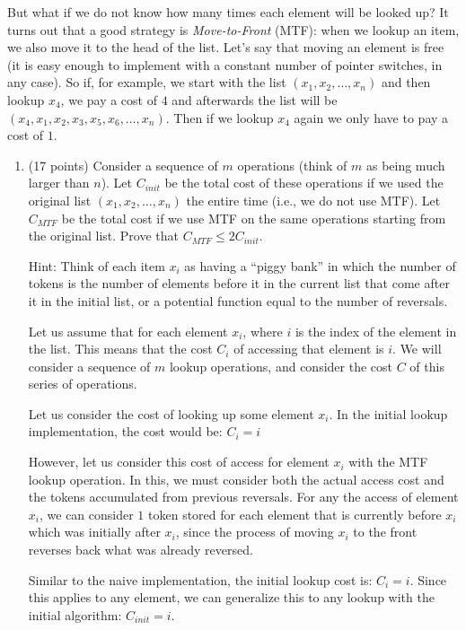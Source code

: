 \documentclass[11pt]{article}
\begin{document}
But what if we do not know how many times each element will be looked up?  It turns out that a good strategy is \emph{Move-to-Front} (MTF): 
when we lookup an item, we also move it to the head of the list.  Let's say that moving an element is free 
(it is easy enough to implement with a constant number of pointer switches, in any case). 
So if, for example, we start with the list $(x_1, x_2, \dots, x_n)$ and then lookup $x_4$, we pay a cost of $4$ and 
afterwards the list will be $(x_4, x_1, x_2, x_3, x_5, x_6, \dots, x_n)$.  Then if we lookup $x_4$ again we only have to pay a cost of $1$.  

\begin{enumerate}

\item (17 points) Consider a sequence of $m$ operations (think of $m$ as being much larger than $n$). 
Let $C_{init}$ be the total cost of these operations if we used the original list $(x_1, x_2, \dots, x_n)$ the entire time (i.e., we do not use MTF). 
Let $C_{MTF}$ be the total cost if we use MTF on the same operations starting from the original list.  Prove that $C_{MTF} \leq 2 C_{init}$.  

Hint: Think of each item $x_i$ as having a ``piggy bank'' in which the number of tokens is the number of elements before it in the current list 
that come after it in the initial list, or a potential function equal to the number of reversals.  

Let us assume that for each element $x_i$, where $i$ is the index of the element in the list. 
This means that the cost $C_i$ of accessing that element is $i$. 
We will consider a sequence of $m$ lookup operations, and consider the cost $C$ of this series of operations. 

Let us consider the cost of looking up some element $x_i$. 
In the initial lookup implementation, the cost would be: $C_i = i$

However, let us consider this cost of access for element $x_i$ with the MTF lookup operation. 
In this, we must consider both the actual access cost and the tokens accumulated from previous reversals. 
For any the access of element $x_i$, we can consider $1$ token stored for each element that is currently before $x_i$ which was initially after $x_i$, 
since the process of moving $x_i$ to the front reverses back what was already reversed. 

Similar to the naive implementation, the initial lookup cost is: $C_i = i$. 
Since this applies to any element, we can generalize this to any lookup with the initial algorithm: $C_{init} = i$.


\end{enumerate}
\end{document}
